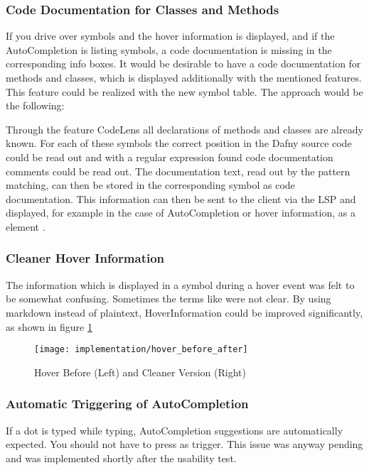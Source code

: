 \subsubsection{Code Documentation for Classes and Methods}
If you drive over symbols and the hover information is displayed,
and if the AutoCompletion is listing symbols,
a code documentation is missing in the corresponding info boxes.
It would be desirable to have a code documentation for methods and classes,
which is displayed additionally with the mentioned features. \\

This feature could be realized with the new symbol table. The approach would be the following:

Through the feature CodeLens all declarations of methods and classes are already known.
For each of these symbols the correct position in the Dafny source code could be read out
and with a regular expression found code documentation comments could be read out.
The documentation text, read out by the pattern matching, can then be stored in the corresponding symbol as code documentation.
This information can then be sent to the client via the LSP and displayed,
for example in the case of AutoCompletion or hover information,
as a  element \cite{vscodeAPI}.

\subsubsection{Cleaner Hover Information}
The information which is displayed in a symbol during a hover event was felt to be somewhat confusing.
Sometimes the terms like  were not clear.
By using markdown instead of plaintext, HoverInformation could be improved significantly, as shown in figure \ref{fig:hoverNowVsThen}\\

\begin{figure}[H]
    \centering
    \texttt{[image: implementation/hover\_before\_after]}
    \caption{Hover Before (Left) and Cleaner Version (Right)}
    \label{fig:hoverNowVsThen}
\end{figure}

\subsubsection{Automatic Triggering of AutoCompletion}
If a dot is typed while typing, AutoCompletion suggestions are automatically expected.
You should not have to press  as trigger.
This issue was anyway pending and was implemented shortly after the usability test.

